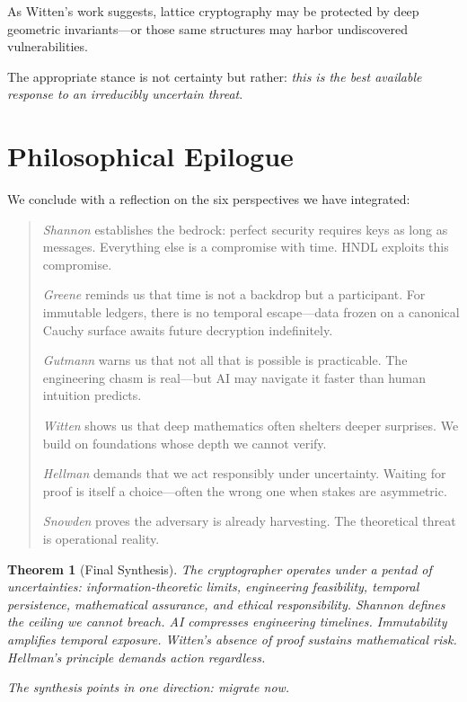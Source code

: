 \documentclass[11pt,a4paper]{article}
\newtheorem{theorem}{Theorem}[section]
\begin{document}
As Witten's work suggests, lattice cryptography may be protected by deep geometric invariants---or those same structures may harbor undiscovered vulnerabilities.

The appropriate stance is not certainty but rather: \textit{this is the best available response to an irreducibly uncertain threat}.

\section{Philosophical Epilogue}

We conclude with a reflection on the six perspectives we have integrated:

\begin{quote}
\textit{Shannon} establishes the bedrock: perfect security requires keys as long as messages. Everything else is a compromise with time. HNDL exploits this compromise.

\textit{Greene} reminds us that time is not a backdrop but a participant. For immutable ledgers, there is no temporal escape---data frozen on a canonical Cauchy surface awaits future decryption indefinitely.

\textit{Gutmann} warns us that not all that is possible is practicable. The engineering chasm is real---but AI may navigate it faster than human intuition predicts.

\textit{Witten} shows us that deep mathematics often shelters deeper surprises. We build on foundations whose depth we cannot verify.

\textit{Hellman} demands that we act responsibly under uncertainty. Waiting for proof is itself a choice---often the wrong one when stakes are asymmetric.

\textit{Snowden} proves the adversary is already harvesting. The theoretical threat is operational reality.
\end{quote}

\begin{theorem}[Final Synthesis]
The cryptographer operates under a pentad of uncertainties: information-theoretic limits, engineering feasibility, temporal persistence, mathematical assurance, and ethical responsibility. Shannon defines the ceiling we cannot breach. AI compresses engineering timelines. Immutability amplifies temporal exposure. Witten's absence of proof sustains mathematical risk. Hellman's principle demands action regardless.

The synthesis points in one direction: migrate now.
\end{theorem}
\end{document}
